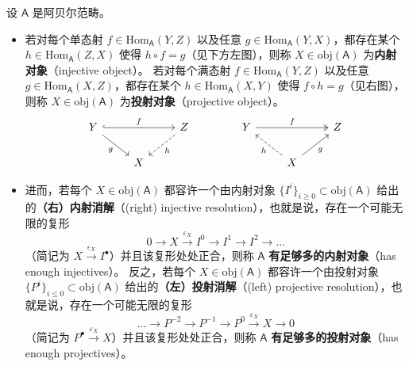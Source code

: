 \begin{Def}\label{injprojobj}
	设 $\mathsf{A}$ 是阿贝尔范畴。
	\begin{itemize}[leftmargin=0.5cm]
		\item 若对每个单态射 $f\in\text{Hom}_\mathsf{A}(Y,Z)$ 以及任意 $g\in\text{Hom}_\mathsf{A}(Y,X)$，都存在某个 $h\in\text{Hom}_\mathsf{A}(Z,X)$ 使得 $h\circ f= g$（见下方左图），则称 $X\in\text{obj}(\mathsf{A})$ 为\textbf{内射对象}（injective object）。
		\newline 若对每个满态射 $f\in\text{Hom}_\mathsf{A}(Y,Z)$ 以及任意 $g\in\text{Hom}_\mathsf{A}(X,Z)$，都存在某个 $h\in\text{Hom}_\mathsf{A}(X,Y)$ 使得 $f\circ h= g$（见右图），则称 $X\in\text{obj}(\mathsf{A})$ 为\textbf{投射对象}（projective object）。
		\begin{equation}\label{injprojobjdiag}
			\begin{tikzcd}
				Y\arrow[rr, hook, "f"]\arrow[dr, "g"'] & & Z\arrow[dl, dashed, "h"] \\
				& X &
			\end{tikzcd}
			\qquad\qquad
			\begin{tikzcd}
				Y\arrow[rr, two heads, "f"] & & Z \\
				& X\arrow[ul, dashed, "h"]\arrow[ur, "g"'] &
			\end{tikzcd}
		\end{equation}

		\item 进而，若每个 $X\in\text{obj}(\mathsf{A})$ 都容许一个由内射对象 $\{I^i\}_{i\geq 0}\subset\text{obj}(\mathsf{A})$ 给出的\textbf{（右）内射消解}（(right) injective resolution），也就是说，存在一个可能无限的复形
		\[
		0\longrightarrow X\xrightarrow{\varepsilon_X} I^0\longrightarrow I^1\longrightarrow I^2\longrightarrow ...
		\] 
		（简记为 $X\xrightarrow{\varepsilon_X}I^\bullet$）并且该复形处处正合，则称 $\mathsf{A}$ \textbf{有足够多的内射对象}（has enough injectives）。
		\newline 反之，若每个 $X\in\text{obj}(\mathsf{A})$ 都容许一个由投射对象 $\{P^i\}_{i\leq 0}\subset\text{obj}(\mathsf{A})$ 给出的\textbf{（左）投射消解}（(left) projective resolution），也就是说，存在一个可能无限的复形
		\[
		... \longrightarrow P^{-2}\longrightarrow P^{-1}\longrightarrow P^0\xrightarrow{\varepsilon_X} X\longrightarrow 0
		\] 
		（简记为 $P^\bullet\xrightarrow{\varepsilon_X}X$）并且该复形处处正合，则称 $\mathsf{A}$ \textbf{有足够多的投射对象}（has enough projectives）。
	\end{itemize}
\end{Def}

